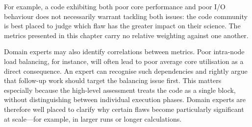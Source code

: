For example, a code exhibiting both poor core performance and poor I/O behaviour does not necessarily warrant tackling both issues: 
the code community is best placed to judge which flaw has the greater impact on their science. 
The metrics presented in this chapter carry no relative weighting against one another.

Domain experts may also identify correlations between metrics. 
Poor intra-node load balancing, for instance, will often lead to poor average core utilisation as a direct consequence. 
An expert can recognise such dependencies and rightly argue that follow-up work should target the balancing issue first. 
This matters especially because the high-level assessment treats the code as a single block, without distinguishing between individual execution phases. 
Domain experts are therefore well placed to clarify why certain flaws become particularly significant at scale---for example, in larger runs or longer calculations.
